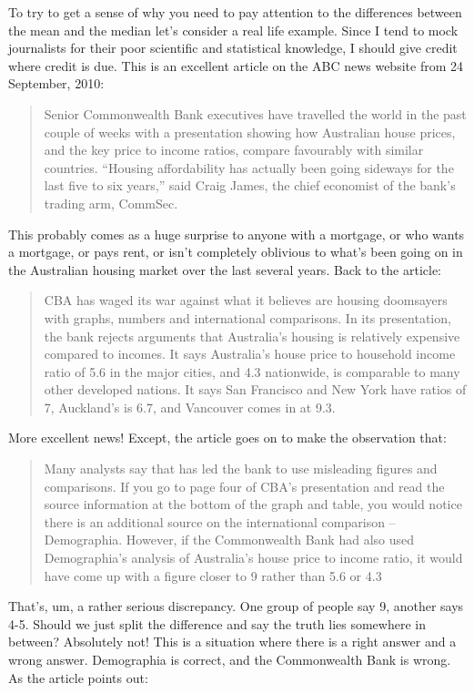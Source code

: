 To try to get a sense of why you need to pay attention to the differences between the mean and the median let's consider a real life example. Since I tend to mock journalists for their poor scientific and statistical knowledge, I should give credit where credit is due. This is an excellent article on the ABC news website from 24 September, 2010:
\small
\begin{quote}
Senior Commonwealth Bank executives have travelled the world in the past couple of weeks with a presentation showing how Australian house prices, and the key price to income ratios, compare favourably with similar countries. ``Housing affordability has actually been going sideways for the last five to six years,'' said Craig James, the chief economist of the bank's trading arm, CommSec.
\end{quote}
\normalsize
This probably comes as a huge surprise to anyone with a mortgage, or who wants a mortgage, or pays rent, or isn't completely oblivious to what's been going on in the Australian housing market over the last several years. Back to the article:
\small
\begin{quote}
CBA has waged its war against what it believes are housing doomsayers with graphs, numbers and international comparisons. In its presentation, the bank rejects arguments that Australia's housing is relatively expensive compared to incomes. It says Australia's house price to household income ratio of 5.6 in the major cities, and 4.3 nationwide, is comparable to many other developed nations. It says San Francisco and New York have ratios of 7, Auckland's is 6.7, and Vancouver comes in at 9.3.
\end{quote}
\normalsize
More excellent news! Except, the article goes on to make the observation that:
\small
\begin{quote}
Many analysts say that has led the bank to use misleading figures and comparisons. If you go to page four of CBA's presentation and read the source information at the bottom of the graph and table, you would notice there is an additional source on the international comparison -- Demographia. However, if the Commonwealth Bank had also used Demographia's analysis of Australia's house price to income ratio, it would have come up with a figure closer to 9 rather than 5.6 or 4.3
\end{quote}
\normalsize
That's, um, a rather serious discrepancy. One group of people say 9, another says 4-5. Should we just split the difference and say the truth lies somewhere in between? Absolutely not! This is a situation where there is a right answer and a wrong answer. Demographia is correct, and the Commonwealth Bank is wrong. As the article points out:
